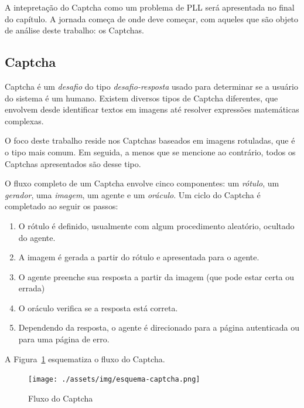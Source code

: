\documentclass[12pt,twoside,brazilian]{book}
\providecommand{\tightlist}{%
  \setlength{\itemsep}{0pt}\setlength{\parskip}{0pt}}
\begin{document}
A intepretação do Captcha como um problema de PLL será apresentada no
final do capítulo. A jornada começa de onde deve começar, com aqueles
que são objeto de análise deste trabalho: os Captchas.

\hypertarget{sec-definicao-captcha}{%
\subsection{Captcha}\label{sec-definicao-captcha}}

Captcha é um \emph{desafio} do tipo \emph{desafio-resposta} usado para
determinar se a usuário do sistema é um humano. Existem diversos tipos
de Captcha diferentes, que envolvem desde identificar textos em imagens
até resolver expressões matemáticas complexas.

O foco deste trabalho reside nos Captchas baseados em imagens rotuladas,
que é o tipo mais comum. Em seguida, a menos que se mencione ao
contrário, todos os Captchas apresentados são desse tipo.

O fluxo completo de um Captcha envolve cinco componentes: um
\emph{rótulo}, um \emph{gerador}, uma \emph{imagem}, um agente e um
\emph{oráculo}. Um ciclo do Captcha é completado ao seguir os passos:

\begin{enumerate}
\def\labelenumi{\arabic{enumi}.}
\tightlist
\item
  O rótulo é definido, usualmente com algum procedimento aleatório,
  ocultado do agente.
\item
  A imagem é gerada a partir do rótulo e apresentada para o agente.
\item
  O agente preenche sua resposta a partir da imagem (que pode estar
  certa ou errada)
\item
  O oráculo verifica se a resposta está correta.
\item
  Dependendo da resposta, o agente é direcionado para a página
  autenticada ou para uma página de erro.
\end{enumerate}

A Figura~\ref{fig-esquema-captcha} esquematiza o fluxo do Captcha.

\begin{figure}

{\centering \texttt{[image: ./assets/img/esquema-captcha.png]}

}

\caption{\label{fig-esquema-captcha}Fluxo do Captcha}

\end{figure}
\end{document}
